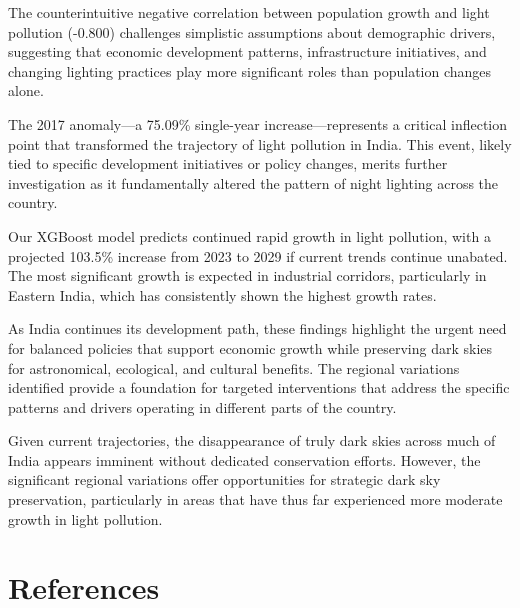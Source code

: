 \documentclass[12pt,a4paper]{article}
\begin{document}
The counterintuitive negative correlation between population growth and light pollution (-0.800) challenges simplistic assumptions about demographic drivers, suggesting that economic development patterns, infrastructure initiatives, and changing lighting practices play more significant roles than population changes alone.

The 2017 anomaly—a 75.09\% single-year increase—represents a critical inflection point that transformed the trajectory of light pollution in India. This event, likely tied to specific development initiatives or policy changes, merits further investigation as it fundamentally altered the pattern of night lighting across the country.

Our XGBoost model predicts continued rapid growth in light pollution, with a projected 103.5\% increase from 2023 to 2029 if current trends continue unabated. The most significant growth is expected in industrial corridors, particularly in Eastern India, which has consistently shown the highest growth rates.

As India continues its development path, these findings highlight the urgent need for balanced policies that support economic growth while preserving dark skies for astronomical, ecological, and cultural benefits. The regional variations identified provide a foundation for targeted interventions that address the specific patterns and drivers operating in different parts of the country.

Given current trajectories, the disappearance of truly dark skies across much of India appears imminent without dedicated conservation efforts. However, the significant regional variations offer opportunities for strategic dark sky preservation, particularly in areas that have thus far experienced more moderate growth in light pollution.

\section{References}
\end{document}
